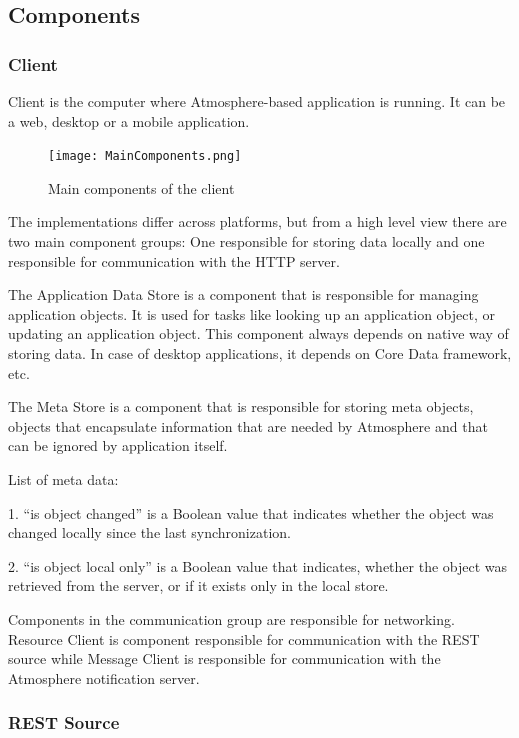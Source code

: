 \subsection{Components}

\subsubsection{Client}

Client is the computer where Atmosphere-based application is running. It can be a web, desktop or a mobile application.

\begin{figure}[ht!]
\centering
\texttt{[image: MainComponents.png]}
\caption{Main components of the client \label{fig:3}}
\end{figure}

The implementations differ across platforms, but from a high level view there are two main component groups: One responsible for storing data locally and one responsible for communication with the HTTP server.

The Application Data Store is a component that is responsible for managing application objects. It is used for tasks like looking up an application object, or updating an application object. This component always depends on native way of storing data. In case of desktop applications, it depends on Core Data framework, etc. 

The Meta Store is a component that is responsible for storing meta objects, objects that encapsulate information that are needed by Atmosphere and that can be ignored by application itself.

List of meta data:

1. ``is object changed'' is a Boolean value that indicates whether the object was changed locally since the last synchronization. 

2. ``is object local only'' is a Boolean value that indicates, whether the object was retrieved from the server, or if it exists only in the local store. 

Components in the communication group are responsible for networking. Resource Client is component responsible for communication with the REST source while Message Client is responsible for communication with the Atmosphere notification server. 

\subsubsection{REST Source}

